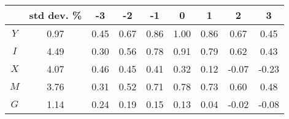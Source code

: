 \begin{tabular}{ccccccccc}
\toprule
 & std dev. \% & -3 & -2 & -1 & 0 & 1 & 2 & 3 \\
\midrule
$Y$ & 0.97 & 0.45 & 0.67 & 0.86 & 1.00 & 0.86 & 0.67 & 0.45 \\
$I$ & 4.49 & 0.30 & 0.56 & 0.78 & 0.91 & 0.79 & 0.62 & 0.43 \\
$X$ & 4.07 & 0.46 & 0.45 & 0.41 & 0.32 & 0.12 & -0.07 & -0.23 \\
$M$ & 3.76 & 0.31 & 0.52 & 0.71 & 0.78 & 0.73 & 0.60 & 0.48 \\
$G$ & 1.14 & 0.24 & 0.19 & 0.15 & 0.13 & 0.04 & -0.02 & -0.08 \\
\bottomrule
\end{tabular}
